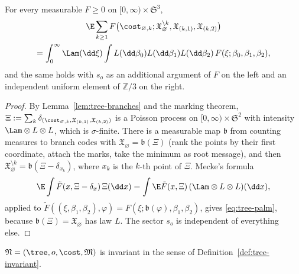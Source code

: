 \begin{lemma}\label{lem:tree-palm}
For every measurable $F\ge0$ on $[0,\infty)\times\mathfrak{S}^3$,
\begin{multline}\label{eq:tree-palm}
  \E\sum_{k\ge1}F\bigl(\cost_{\varnothing,k};\mathfrak{X}_\varnothing^{\setminus k},
     \mathfrak{X}_{(k,1)},\mathfrak{X}_{(k,2)}\bigr)\\
  =\int_0^\infty\Lam(\dd\xi)\int L(\dd\beta_0)L(\dd\beta_1)L(\dd\beta_2)\,
     F(\xi;\beta_0,\beta_1,\beta_2),
\end{multline}
and the same holds with $s_o$ as an additional argument of $F$ on the left and an independent
uniform element of $\mathbb{Z}/3$ on the right.
\end{lemma}

\begin{proof}
By Lemma~\ref{lem:tree-branches} and the marking theorem,
$\Xi:=\sum_k\delta_{(\cost_{\varnothing,k},\mathfrak{X}_{(k,1)},\mathfrak{X}_{(k,2)})}$ is a
Poisson process on $[0,\infty)\times\mathfrak{S}^2$ with intensity
$\Lam\otimes L\otimes L$, which is $\sigma$-finite. There is a measurable map $\mathfrak{b}$
from counting measures to branch codes with $\mathfrak{X}_\varnothing=\mathfrak{b}(\Xi)$ (rank
the points by their first coordinate, attach the marks, take the minimum as root message), and
then $\mathfrak{X}_\varnothing^{\setminus k}=\mathfrak{b}(\Xi-\delta_{x_k})$, where $x_k$ is
the $k$-th point of $\Xi$. Mecke's formula
\[
  \E\int\tilde F(x,\Xi-\delta_x)\,\Xi(\dd x)=\int\E\tilde F(x,\Xi)\,(\Lam\otimes L\otimes L)(\dd x),
\]
applied to $\tilde F((\xi,\beta_1,\beta_2),\varphi)=F(\xi;\mathfrak{b}(\varphi),\beta_1,\beta_2)$,
gives \eqref{eq:tree-palm}, because $\mathfrak{b}(\Xi)=\mathfrak{X}_\varnothing$ has law $L$.
The sector $s_o$ is independent of everything else.
\end{proof}

\begin{lemma}\label{lem:tree-msg-invariant}
$\mathfrak{N}=(\tree,o,\cost,\mathfrak{M})$ is invariant in the sense of
Definition~\ref{def:tree-invariant}.
\end{lemma}

